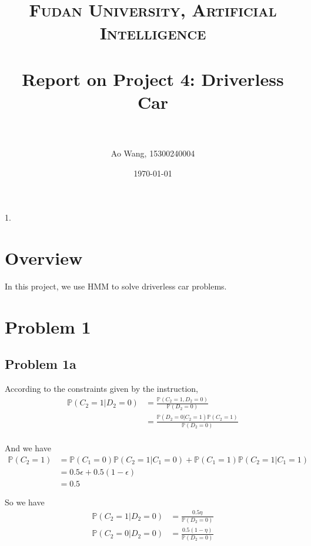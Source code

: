 \documentclass[paper=a4, fontsize=10pt]{scrartcl} %
\title{	
\normalfont \normalsize 
\textsc{Fudan University, Artificial Intelligence} \\ [0pt] %
\horrule{1pt} \\[0.4cm] %
\LARGE Report on Project 4: Driverless Car \\ %
\horrule{1pt} \\[0cm] %
}
\author{Ao Wang, 15300240004} %
\date{\normalsize\today} %
\numberwithin{equation}{section} %
\numberwithin{figure}{section} %
\numberwithin{table}{section} %
\begin{document}
\begin{spacing}{1.}

\maketitle %


\section{Overview}
In this project, we use HMM to solve driverless car problems.

\section{Problem 1}
\subsection{Problem 1a}
According to the constraints given by the instruction,
\begin{displaymath}
\begin{aligned}
\mathbb{P}(C_{2}=1|D_{2}=0) & = \frac{\mathbb{P}(C_{2}=1, D_{2}=0)}{\mathbb{P}(D_{2}=0)} \\
&= \frac{\mathbb{P}(D_{2}=0|C_{2}=1) \mathbb{P}(C_{2}=1)}{\mathbb{P}(D_{2}=0)}\\
\end{aligned}
\end{displaymath}

And we have
\begin{displaymath}
\begin{aligned}
\mathbb{P}(C_{2}=1) &= \mathbb{P}(C_{1}=0)\mathbb{P}(C_{2}=1|C_{1}=0) + \mathbb{P}(C_{1}=1)\mathbb{P}(C_{2}=1|C_{1}=1)\\
& = 0.5 \epsilon + 0.5 (1 - \epsilon)\\
& = 0.5
\end{aligned}
\end{displaymath}

So we have
\begin{displaymath}
\begin{aligned}
\mathbb{P}(C_{2}=1|D_{2}=0) &= \frac{0.5 \eta}{\mathbb{P}(D_{2}=0)}\\
\mathbb{P}(C_{2}=0|D_{2}=0) &= \frac{0.5 (1 - \eta)}{\mathbb{P}(D_{2}=0)}
\end{aligned}
\end{displaymath}


\end{spacing}
\end{document}
